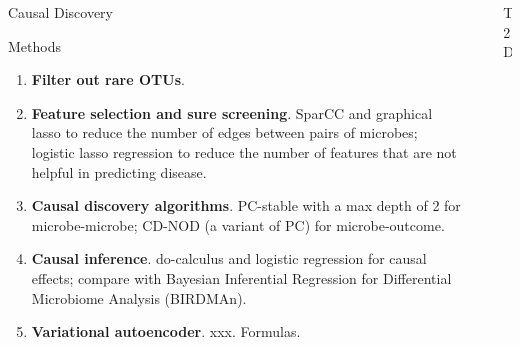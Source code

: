 \documentclass[final]{beamer}
\newlength{\sepwidth}
\newlength{\colwidth}
\newcommand{\separatorcolumn}{\begin{column}{\sepwidth}\end{column}}
\begin{document}
\begin{frame}[t]
\begin{columns}[t]
\begin{column}{\colwidth}
\begin{alertblock}{Causal Discovery}
	  \end{alertblock}
	  
\begin{block}{Methods}


    \begin{enumerate}
      \item \textbf{Filter out rare OTUs}. 
      \item \textbf{Feature selection and sure screening}. SparCC and graphical lasso to reduce the number of edges between pairs of microbes; logistic lasso regression to reduce the number of features that are not helpful in predicting disease. 
      \item \textbf{Causal discovery algorithms}. PC-stable with a max depth of 2 for microbe-microbe; CD-NOD (a variant of PC) for microbe-outcome.
      \item \textbf{Causal inference}. do-calculus and logistic regression for causal effects; compare with Bayesian Inferential Regression for Differential Microbiome Analysis (BIRDMAn).
      \item \textbf{Variational autoencoder}. xxx. Formulas.
    \end{enumerate}

  \end{block}


\end{column}

\separatorcolumn

\begin{column}{\colwidth}

  
  \begin{block}{T2D}



\end{block}
\end{column}
\end{columns}
\end{frame}
\end{document}
